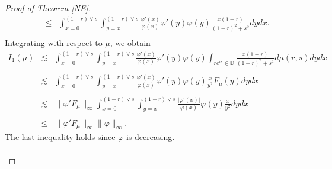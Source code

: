 \documentclass[12pt,reqno,a4paper]{amsart}
\newcommand\DD{\mathbb{D}}
\numberwithin{equation}{section}
\begin{document}
\begin{proof}[Proof of Theorem \ref{NE}]
\[\begin{array}{lll}
		& \leq &  \displaystyle \int _{x=0}^{(1-r)\vee s}  \displaystyle \int _{y=x}^{(1-r) \vee s}  \frac{\varphi'(x)}{\varphi(x)}\varphi'(y)\varphi(y)\frac{x(1-r) }{(1-r)^2+s^2}dydx.\\
	\end{array}
	\]
	Integrating with respect to $\mu$, we obtain 
	\[
	\begin{array}{lll}
		I_1(\mu) &\lesssim  &\displaystyle \int _{x=0}^{{(1-r)\vee s}}  \displaystyle \int _{y=x}^{(1-r) \vee s}  \frac{\varphi'(x)}{\varphi(x)}\varphi'(y)\varphi(y)\displaystyle \int _{re^{is}\in \DD}\frac{x(1-r) }{(1-r)^2+s^2}d\mu(r,s)dydx\\
		\\
		& \lesssim &  \displaystyle \int _{x=0}^{(1-r)\vee s}  \displaystyle \int _{y=x}^{(1-r) \vee s}  \frac{\varphi'(x)}{\varphi(x)}\varphi'(y)\varphi(y)\frac{x}{y^2}F_\mu(y)dydx\\
		\\
		& \lesssim & \| \varphi ' F_\mu\|_\infty  \displaystyle \int _{x=0}^{(1-r)\vee s}  \displaystyle \int _{y=x}^{(1-r) \vee s}  \frac{\vert\varphi'(x)\vert}{\varphi(x)}\varphi(y)\frac{x}{y^2}dydx\\
		\\
		& \leq &\| \varphi ' F_\mu\|_\infty \|\varphi\|_\infty.
	\end{array}
	\]
	The last inequality holds since $\varphi$ is decreasing. 
	\\
	
	\\
	

\end{proof}
\end{document}
